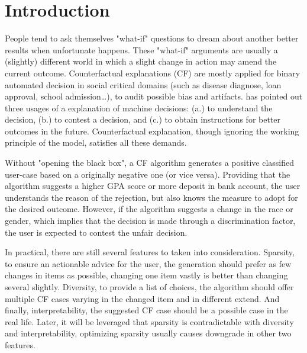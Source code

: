 \section{Introduction}
 People tend to ask themselves "what-if" questions to dream about another better results when unfortunate happens. These "what-if" arguments are usually a (slightly) different world in which a slight change in action may amend the current outcome. Counterfactual explanations (CF) are mostly applied for binary automated decision in social critical domains (such as disease diagnose, loan approval, school admission\dots), to audit possible bias and artifacts. \cite{watcher2017} has pointed out three usages of a explanation of machine decisions: (a.) to understand the decision, (b.) to contest a decision, and (c.) to obtain instructions for better outcomes in the future. Counterfactual explanation, though ignoring the working principle of the model, satisfies all these demands.

 Without "opening the black box", a CF algorithm generates a positive classified user-case based on a originally negative one (or vice versa). Providing that the algorithm suggests a higher GPA score or more deposit in bank account, the user understands the reason of the rejection, but also knows the measure to adopt for the desired outcome. However, if the algorithm suggests a change in the race or gender, which implies that the decision is made through a discrimination factor, the user is expected to contest the unfair decision.

 In practical, there are still several features to taken into consideration. Sparsity, to ensure an actionable advice for the user, the generation should prefer as few changes in items as possible, changing one item vastly is better than changing several slightly. Diversity, to provide a list of choices, the algorithm should offer multiple CF cases varying in the changed item and in different extend. And finally, interpretability, the suggested CF case should be a possible case in the real life. Later, it will be leveraged that sparsity is contradictable with diversity and interpretability, optimizing sparsity usually causes downgrade in other two features.

